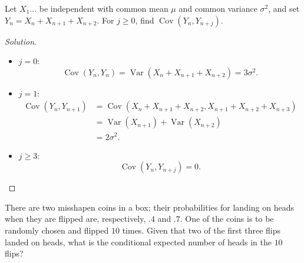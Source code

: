 \documentclass{article}[12pt]
\newenvironment{solution}
  {\renewcommand\qedsymbol{$\blacksquare$}\begin{proof}[Solution]}
  {\end{proof}}
\newenvironment{problem}[1]
  {\renewcommand\theinnercustomprblm{#1}\innercustomprblm}
  {\endinnercustomprblm}
\DeclareMathOperator{\Var}{Var}
\DeclareMathOperator{\Cov}{Cov}
\begin{document}
\begin{problem}{7.39}
Let $X_{1}\dots$ be independent with common mean $\mu$ and common variance $\sigma^{2}$, and set $Y_{n} = X_{n} + X_{n+1} + X_{n+2}$.
For $j\geqslant 0$, find $\Cov(Y_{n}, Y_{n+j})$.
\end{problem}
\begin{solution}
\text{}
\begin{itemize}
    \item $j = 0$:
    \begin{equation}
        \Cov(Y_{n}, Y_{n}) = \Var(X_{n} + X_{n+1} + X_{n+2}) = 3\sigma^{2}.
    \end{equation}
    \item $j =1$:
    \begin{align*}
        \Cov(Y_{n}, Y_{n+1}) &= \Cov(X_{n} + X_{n+1} + X_{n+2}, X_{n+1} + X_{n+2} + X_{n+3})
        \\
        &= \Var(X_{n+1}) + \Var(X_{n+2}) 
        \\
        &= 2\sigma^{2}.
    \end{align*}
    \item $j\geqslant 3$:
    \begin{equation*}
        \Cov(Y_{n}, Y_{n+j}) = 0.
    \end{equation*}
    \end{itemize}
\end{solution}

\begin{problem}{7.49}
There are two misshapen coins in a box; their probabilities for landing on heads when they are flipped are, respectively, $.4$ and $.7$.
One of the coins is to be randomly chosen and flipped $10$ times.
Given that two of the first three flips landed on heads, what is the conditional expected number of heads in the $10$ flips?
\end{problem}

\newpage
\end{document}
